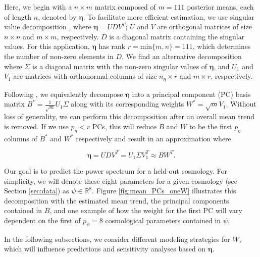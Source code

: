 \documentclass[11pt]{article}
\begin{document}
Here, we begin with a $n \times m$ matrix composed of $m=111$ posterior means, 
each of length $n$, denoted by $\boldsymbol\eta$. To facilitate more efficient estimation, 
we use singular value decomposition \citep[SVD; e.g.,][]{banerjee2014linear}, 
where $\boldsymbol\eta = UDV^T$; $U$ and $V$ are orthogonal matrices of size $n \times n$ 
and $m\times m$, respectively. $D$ is a diagonal matrix containing the singular values. 
For this application, $\boldsymbol\eta$ has rank $r=\text{min}\{m,n\}=111$, which 
determines the number of non-zero elements in $D$. We find an alternative decomposition 
where $\Sigma$ is a diagonal matrix with the non-zero singular values of $\boldsymbol\eta$, 
and $U_1$ and $V_1$ are matrices with orthonormal columns of size $n_\eta \times r$ 
and $m \times r$, respectively. 

Following \cite{higdon2008computer, higdon2010estcosmo}, we equivalently decompose 
$\boldsymbol\eta$ into a principal component (PC) basis matrix 
$B^* = \frac{1}{\sqrt{m}}U_1\Sigma$ along with its corresponding weights 
$W^* = \sqrt{m}V_1$. Without loss of generality, we can perform this decomposition 
after an overall mean trend is removed. If we use $p_\eta < r$ PCs, this will reduce 
$B$ and $W$ to be the first $p_\eta$ columns of $B^*$ and $W^*$ respectively and 
result in an approximation where 

\begin{equation}
    \boldsymbol\eta= UDV^T = U_1\Sigma V_1^T \approx BW^T.
\end{equation}

Our goal is to predict the power spectrum for a held-out cosmology. 
For simplicity, we will denote these eight parameters for a given cosmology (see 
Section \ref{sec:data}) as $\psi \in \mathbb{R}^8$. 
Figure \ref{fig:mean_PCs_oneW} illustrates this decomposition with the estimated 
mean trend, the principal components contained in $B$, and one example of how the 
weight for the first PC will vary dependent on the first of $p_\psi=8$ cosmological 
parameters contained in $\psi$.

In the following subsections, we consider different modeling strategies for $W$, 
which will influence predictions and sensitivity analyses based on $\boldsymbol\eta$.
\end{document}
